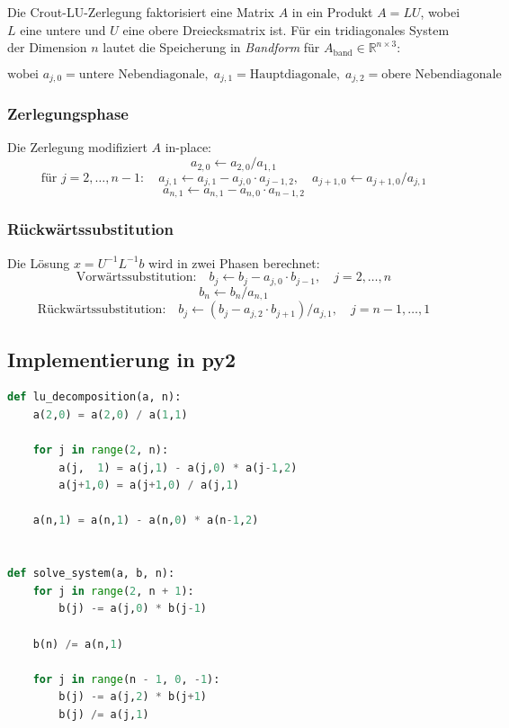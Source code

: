 \documentclass[a4paper,12pt]{article}
\theoremstyle{definition}
\begin{document}
Die Crout-LU-Zerlegung faktorisiert eine Matrix $A$ in ein Produkt $A = LU$, wobei
$L$ eine untere und $U$ eine obere Dreiecksmatrix ist. F\"ur ein tridiagonales System
der Dimension $n$ lautet die Speicherung in \emph{Bandform} für $A_{\text{band}} \in \mathbb{R}^{n \times 3}$:

\[
	\text{wobei } a_{j,0} = \text{untere Nebendiagonale},\;
	a_{j,1} = \text{Hauptdiagonale},\;
	a_{j,2} = \text{obere Nebendiagonale}
\]

\subsubsection{Zerlegungsphase}

Die Zerlegung modifiziert $A$ in-place:
\[
	a_{2,0} \leftarrow a_{2,0} / a_{1,1}
\]
\[
	\text{f\"ur } j = 2, \ldots, n-1: \quad
	a_{j,1} \leftarrow a_{j,1} - a_{j,0} \cdot a_{j-1,2}, \quad
	a_{j+1,0} \leftarrow a_{j+1,0} / a_{j,1}
\]
\[
	a_{n,1} \leftarrow a_{n,1} - a_{n,0} \cdot a_{n-1,2}
\]

\subsubsection{R\"uckw\"artssubstitution}

Die L\"osung $x = U^{-1} L^{-1} b$ wird in zwei Phasen berechnet:
\[
	\text{Vorw\"artssubstitution:} \quad
	b_j \leftarrow b_j - a_{j,0} \cdot b_{j-1}, \quad j = 2, \ldots, n
\]
\[
	b_n \leftarrow b_n / a_{n,1}
\]
\[
	\text{R\"uckw\"artssubstitution:} \quad
	b_j \leftarrow (b_j - a_{j,2} \cdot b_{j+1}) / a_{j,1}, \quad j = n-1, \ldots, 1
\]

\subsection{Implementierung in py2}

\begin{lstlisting}[language=Python, caption={Vollst\"andige Crout-Implementierung in py2-Syntax}]
def lu_decomposition(a, n):
    a(2,0) = a(2,0) / a(1,1)

    for j in range(2, n):
        a(j,  1) = a(j,1) - a(j,0) * a(j-1,2)
        a(j+1,0) = a(j+1,0) / a(j,1)

    a(n,1) = a(n,1) - a(n,0) * a(n-1,2)


def solve_system(a, b, n):
    for j in range(2, n + 1):
        b(j) -= a(j,0) * b(j-1)

    b(n) /= a(n,1)

    for j in range(n - 1, 0, -1):
        b(j) -= a(j,2) * b(j+1)
        b(j) /= a(j,1)
\end{lstlisting}
\end{document}
